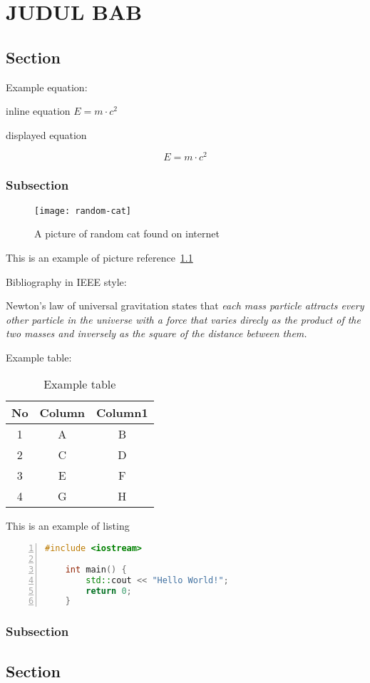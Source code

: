 \chapter{JUDUL BAB}
\section{Section}
\lipsum[1]
Example equation:

inline equation $E=m\cdot c^2$

displayed equation

\begin{equation}
    E=m\cdot c^2
\end{equation}

\subsection{Subsection}

\begin{figure}[H]
    \centering
    \texttt{[image: random-cat]}
    \caption{A picture of random cat found on internet}\label{random-cat}
\end{figure}

This is an example of picture reference~\cref{random-cat}

Bibliography in IEEE style:

Newton's law of universal gravitation states that \textit{each mass particle attracts every other particle in the universe with a force that varies direcly as the product of the two masses and inversely as the square of the distance between them.}~\autocite{book:classical}

Example table:

\begin{table}[H]
    \centering
    \caption{Example table}\label{table1}
    \begin{tabular}{ccc}
        \toprule
        No & Column & Column1 \\
        \midrule
        1  & A      & B       \\
        2  & C      & D       \\
        3  & E      & F       \\
        4  & G      & H       \\
        \bottomrule
    \end{tabular}
\end{table}

This is an example of listing
\begin{lstlisting}[language=c++, caption={C++ Hello World!}, frame=shadowbox, numbers=left]
    #include <iostream>

    int main() {
        std::cout << "Hello World!";
        return 0;
    }
\end{lstlisting}

\lipsum[1]
\subsection{Subsection}
\lipsum[1]
\section{Section}
\lipsum[2]

